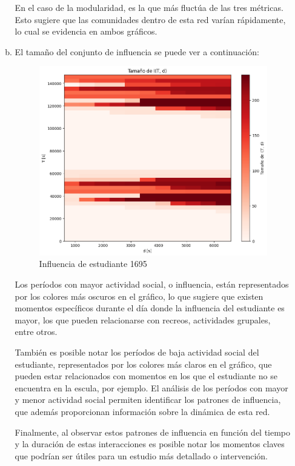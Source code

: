 \documentclass[10pt]{article}
\begin{document}
\begin{itemize}
\begin{enumerate}[(a)]
            En el caso de la modularidad, es la que más fluctúa de las tres métricas. Esto sugiere que las comunidades dentro de esta red varían rápidamente, lo cual se evidencia en ambos gráficos.
            \newpage
            \item El tamaño del conjunto de influencia se puede ver a continuación:
            \begin{figure}[H]
                \centering
                \includegraphics[scale=0.4]{images/influencia.png}
                \caption{Influencia de estudiante 1695}
                \label{fig:influencia}
            \end{figure}
            Los períodos con mayor actividad social, o influencia, están representados por los colores más oscuros en el gráfico, lo que sugiere que existen momentos específicos durante el día donde la influencia del estudiante es mayor, los que pueden relacionarse con recreos, actividades grupales, entre otros.

            También es posible notar los períodos de baja actividad social del estudiante, representados por los colores más claros en el gráfico, que pueden estar relacionados con momentos en los que el estudiante no se encuentra en la escula, por ejemplo. El análisis de los períodos con mayor y menor actividad social permiten identificar los patrones de influencia, que además proporcionan información sobre la dinámica de esta red.

            Finalmente, al observar estos patrones de influencia en función del tiempo y la duración de estas interacciones es posible notar los momentos claves que podrían ser útiles para un estudio más detallado o intervención.
        \end{enumerate}
\end{itemize}
\end{document}
